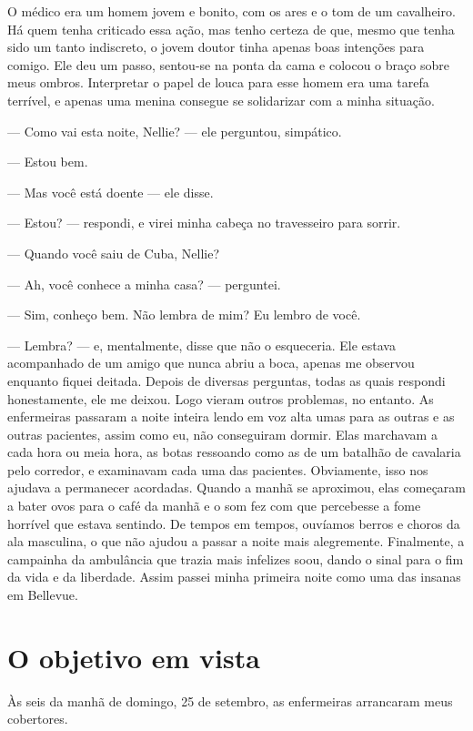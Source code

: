 O médico era um homem jovem e bonito, com os ares e o tom de um
cavalheiro. Há quem tenha criticado essa ação, mas tenho certeza de que,
mesmo que tenha sido um tanto indiscreto, o jovem doutor tinha apenas
boas intenções para comigo. Ele deu um passo, sentou-se na ponta da cama
e colocou o braço sobre meus ombros. Interpretar o papel de louca para
esse homem era uma tarefa terrível, e apenas uma menina consegue se
solidarizar com a minha situação.

--- Como vai esta noite, Nellie? --- ele perguntou, simpático.

--- Estou bem.

--- Mas você está doente --- ele disse.

--- Estou? --- respondi, e virei minha cabeça no travesseiro para
sorrir.

--- Quando você saiu de Cuba, Nellie?

--- Ah, você conhece a minha casa? --- perguntei.

--- Sim, conheço bem. Não lembra de mim? Eu lembro de você.

--- Lembra? --- e, mentalmente, disse que não o esqueceria. Ele estava
acompanhado de um amigo que nunca abriu a boca, apenas me observou
enquanto fiquei deitada. Depois de diversas perguntas, todas as quais
respondi honestamente, ele me deixou. Logo vieram outros problemas, no
entanto. As enfermeiras passaram a noite inteira lendo em voz alta umas
para as outras e as outras pacientes, assim como eu, não conseguiram
dormir. Elas marchavam a cada hora ou meia hora, as botas ressoando como
as de um batalhão de cavalaria pelo corredor, e examinavam cada uma das
pacientes. Obviamente, isso nos ajudava a permanecer acordadas. Quando a
manhã se aproximou, elas começaram a bater ovos para o café da manhã e o
som fez com que percebesse a fome horrível que estava sentindo. De
tempos em tempos, ouvíamos berros e choros da ala masculina, o que não
ajudou a passar a noite mais alegremente. Finalmente, a campainha da
ambulância que trazia mais infelizes soou, dando o sinal para o fim da
vida e da liberdade. Assim passei minha primeira noite como uma das
insanas em Bellevue.

\label{section-4}

\chapter{O objetivo em
vista}\label{capuxedtulo-vii-o-objetivo-em-vista}

Às seis da manhã de domingo, 25 de setembro, as enfermeiras arrancaram
meus cobertores. 

